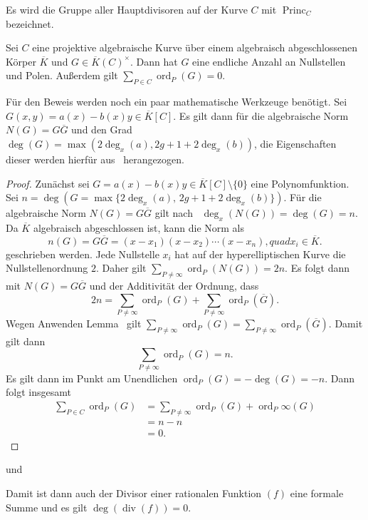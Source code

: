 \cite[S.67]{Cohen06}
\cite[S.140]{Hulek12}
Es wird die Gruppe aller Hauptdivisoren auf der Kurve $C$ mit $\operatorname{Princ}_C$ bezeichnet.
\begin{theorem}
  Sei $C$ eine projektive algebraische Kurve über einem algebraisch abgeschlossenen Körper $\overline{K}$ und $G\in\overline{K}(C)^\times$. Dann hat $G$ eine endliche Anzahl an Nullstellen und Polen. Außerdem gilt $\sum_{P\in C}\operatorname{ord}_P(G)=0$.
\end{theorem}
Für den Beweis werden noch ein paar mathematische Werkzeuge benötigt. Sei $G(x,y)=a(x)-b(x)y\in \overline{K}[C]$. Es gilt dann für die algebraische Norm $N(G)=G\overline{G}$ und den Grad $\deg(G)=\max(2\deg_x(a),2g+1+2\deg_x(b))$, die Eigenschaften dieser werden hierfür aus~\cite[S.~7--9]{Menezes96} herangezogen.
\begin{proof}
  Zunächst sei $G=a(x)-b(x)y\in \overline K[C]\setminus\{0\}$ eine Polynomfunktion.  Sei $n=\deg(G=\max\{2\deg_x(a),\,2g+1+2\deg_x(b)\})$. Für die algebraische Norm $N(G)=G \overline G$ gilt nach~\cite[S.~9, Lemma 16]{Menezes96} \(\deg_x(N(G))=\deg(G)=n\). Da $\overline{K}$ algebraisch abgeschlossen ist, kann die Norm als
  \[
    n(G)=G\overline{G}=(x-x_1)(x-x_2)\cdots(x-x_n), quad x_i\in \overline{K}.
  \]
  geschrieben werden. Jede Nullstelle $x_i$ hat auf der hyperelliptischen Kurve die
  Nullstellenordnung $2$. Daher gilt \( \sum_{P\neq\infty}\operatorname{ord}_P(N(G))=2n\). Es folgt dann mit $N(G)=G\overline{G}$ und der Additivität der Ordnung, dass
  \[
  2n=
  \sum_{P\neq\infty}\operatorname{ord}_P(G)
  +
  \sum_{P\neq\infty}\operatorname{ord}_P(\overline G).
  \]
  Wegen Anwenden Lemma~\cite[S~15, Lemma 28]{Menezes96} gilt \(\sum_{P\neq\infty}\operatorname{ord}_P(G)=\sum_{P\neq\infty}\operatorname{ord}_P(\overline G)\). Damit gilt dann
  \[
  \sum_{P\neq\infty}\operatorname{ord}_P(G)=n.
  \]
  Es gilt dann im Punkt am Unendlichen \(\operatorname{ord}_P(G)=-\deg(G)=-n\). Dann folgt insgesamt
  \begin{align*}
    \sum_{P\in C}\operatorname{ord}_P(G) &= \sum_{P\neq \infty}\operatorname{ord}_P(G)+\operatorname{ord}_P\infty(G)\\
    &= n-n\\
    &= 0.
  \end{align*}
\end{proof}
\cite[S.15]{Menezes96} und \cite[S.~97]{Fuelton08}
\begin{remark}
  Damit ist dann auch der Divisor einer rationalen Funktion $(f)$ eine formale Summe und es gilt $\deg(\operatorname{div}(f))=0$.
\end{remark}
